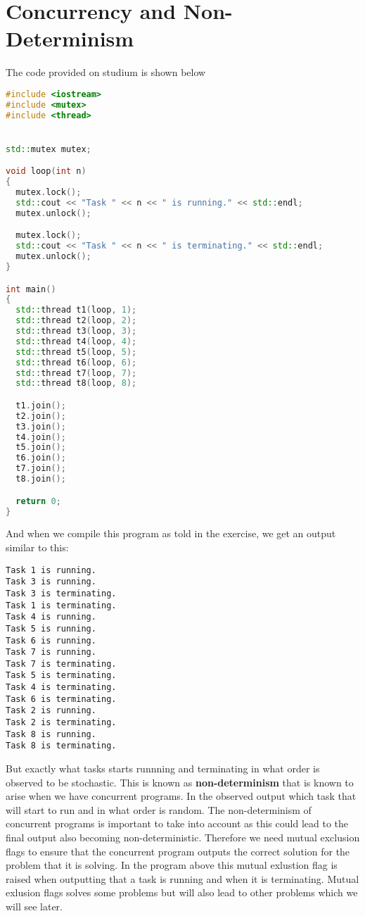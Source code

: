 \section{Concurrency and Non-Determinism}

The code provided on studium is shown below

\begin{lstlisting}[language=C++, caption=non-determinism.cpp]
#include <iostream>
#include <mutex>
#include <thread>


std::mutex mutex;

void loop(int n)
{
  mutex.lock();
  std::cout << "Task " << n << " is running." << std::endl;
  mutex.unlock();

  mutex.lock();
  std::cout << "Task " << n << " is terminating." << std::endl;
  mutex.unlock();
}

int main()
{
  std::thread t1(loop, 1);
  std::thread t2(loop, 2);
  std::thread t3(loop, 3);
  std::thread t4(loop, 4);
  std::thread t5(loop, 5);
  std::thread t6(loop, 6);
  std::thread t7(loop, 7);
  std::thread t8(loop, 8);

  t1.join();
  t2.join();
  t3.join();
  t4.join();
  t5.join();
  t6.join();
  t7.join();
  t8.join();

  return 0;
}
\end{lstlisting}

And when we compile this program as told in the exercise, we get an output
similar to this:

\begin{lstlisting}
Task 1 is running.
Task 3 is running.
Task 3 is terminating.
Task 1 is terminating.
Task 4 is running.
Task 5 is running.
Task 6 is running.
Task 7 is running.
Task 7 is terminating.
Task 5 is terminating.
Task 4 is terminating.
Task 6 is terminating.
Task 2 is running.
Task 2 is terminating.
Task 8 is running.
Task 8 is terminating.
\end{lstlisting}

But exactly what tasks starts runnning and terminating in what order is
observed to be stochastic. This is known as \textbf{non-determinism} that is 
known to arise when we have concurrent programs. In the observed output which 
task that will start to run and in what order is random. The non-determinism
of concurrent programs is important to take into account as this could lead to
the final output also becoming non-deterministic. Therefore we need mutual 
exclusion flags to ensure that the concurrent program outputs the correct solution
for the problem that it is solving. In the program above this mutual exlustion
flag is raised when outputting that a task is running and when it is terminating.
Mutual exlusion flags solves some problems but will also lead to other problems
which we will see later.

